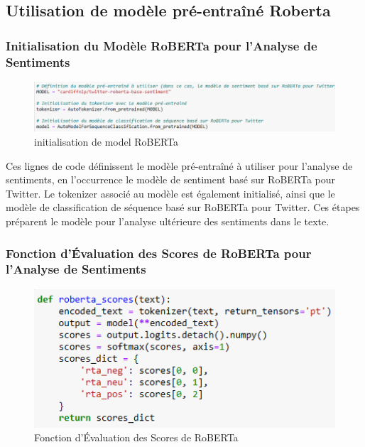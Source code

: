 

\subsection{Utilisation de modèle pré-entraîné Roberta}

\subsubsection{Initialisation du Modèle RoBERTa pour l'Analyse de Sentiments}
\begin{figure}[h]
    \centering
    \includegraphics[scale=0.6]{assets/iniRoberta.PNG}
    \caption{initialisation de model RoBERTa}
    \label{fig:initroberta}
\end{figure}
Ces lignes de code définissent le modèle pré-entraîné à utiliser pour l'analyse de sentiments, en l'occurrence le modèle de sentiment basé sur RoBERTa pour Twitter. Le tokenizer associé au modèle est également initialisé, ainsi que le modèle de classification de séquence basé sur RoBERTa pour Twitter. Ces étapes préparent le modèle pour l'analyse ultérieure des sentiments dans le texte.


\subsubsection{Fonction d'Évaluation des Scores de RoBERTa pour l'Analyse de Sentiments}

\begin{figure}[h]
    \centering
    \includegraphics[scale=0.6]{assets/robertaFun.PNG}
    \caption{Fonction d'Évaluation des Scores de RoBERTa}
    \label{fig:evalfunroberta}
\end{figure}
